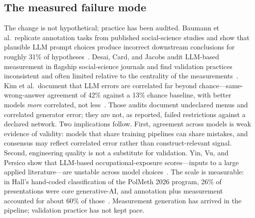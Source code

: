 \documentclass[10pt,letterpaper]{article}
\begin{document}
\subsection{The measured failure mode}
The change is not hypothetical; practice has been audited.
Baumann et al.~replicate annotation tasks from published social-science studies and show that plausible LLM prompt choices produce incorrect downstream conclusions for roughly 31\% of hypotheses~\cite{bauman2026}.
Desai, Card, and Jacobs audit LLM-based measurement in flagship social-science journals and find validation practices inconsistent and often limited relative to the centrality of the measurements~\cite{desai2026}.
Kim et al.~document that LLM errors are correlated far beyond chance---same-wrong-answer agreement of 42\% against a 13\% chance baseline, with better models \emph{more} correlated, not less~\cite{kim2025}.
Those audits document undeclared menus and correlated generator error; they are not, as reported, failed restrictions against a declared network.
Two implications follow.
First, agreement across models is weak evidence of validity: models that share training pipelines can share mistakes, and consensus may reflect correlated error rather than construct-relevant signal.
Second, engineering quality is not a substitute for validation.
Yin, Vu, and Persico show that LLM-based occupational-exposure scores---inputs to a large applied literature---are unstable across model choices~\cite{yinvu2026}.
The scale is measurable: in Hall's hand-coded classification of the PolMeth 2026 program, 26\% of presentations were core generative-AI, and annotation plus measurement accounted for about 60\% of those~\cite{hall2026}.
Measurement generation has arrived in the pipeline; validation practice has not kept pace.
\end{document}
